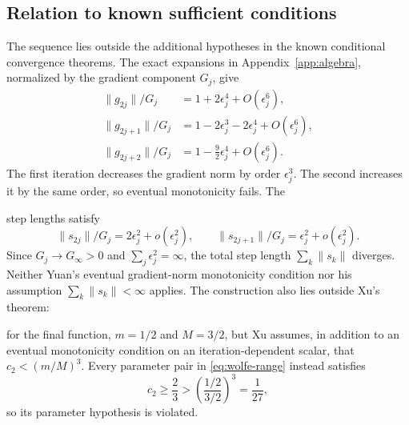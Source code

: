 \documentclass[11pt]{article}
\newcommand{\norm}[1]{\lVert #1\rVert}
\begin{document}
\subsection{Relation to known sufficient conditions}
\label{sec:known-results}

The sequence lies outside the additional hypotheses in the known conditional
convergence theorems.  The exact expansions in
Appendix~\ref{app:algebra}, normalized by the gradient component $G_j$, give
\begin{align*}
\norm{g_{2j}}/G_j
 &=1+2\epsilon_j^4+O(\epsilon_j^6),\\
\norm{g_{2j+1}}/G_j
 &=1-2\epsilon_j^3-2\epsilon_j^4+O(\epsilon_j^6),\\
\norm{g_{2j+2}}/G_j
 &=1-\frac92\epsilon_j^4+O(\epsilon_j^6).
\end{align*}
The first iteration decreases the gradient norm by order $\epsilon_j^3$.  The
second increases it by the same order, so eventual monotonicity fails.  The

step lengths satisfy
\[
\norm{s_{2j}}/G_j=2\epsilon_j^2+o(\epsilon_j^2),
\qquad
\norm{s_{2j+1}}/G_j=\epsilon_j^2+o(\epsilon_j^2).
\]
Since $G_j\to G_\infty>0$ and $\sum_j\epsilon_j^2=\infty$, the total step
length $\sum_k\norm{s_k}$ diverges.  Neither Yuan's eventual gradient-norm
monotonicity condition nor his assumption $\sum_k\norm{s_k}<\infty$
\cite{Yuan1995} applies.  The construction also lies outside Xu's theorem:

for the final function, $m=1/2$ and $M=3/2$, but Xu
\cite{Xu1997} assumes, in addition to an eventual monotonicity condition on an
iteration-dependent scalar, that $c_2<(m/M)^3$.  Every parameter pair in
\eqref{eq:wolfe-range} instead satisfies
\[
c_2\ge\frac23>
\left(\frac{1/2}{3/2}\right)^3=\frac1{27},
\]
so its parameter hypothesis is violated.
\end{document}
